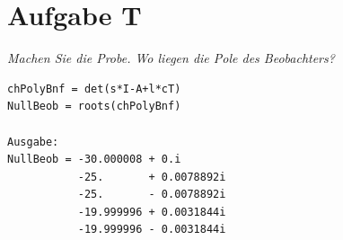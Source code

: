 \section{Aufgabe T}
\textit{Machen Sie die Probe. Wo liegen die Pole des Beobachters?}
 
\begin{lstlisting}[caption = Pole des Beobachters, captionpos = b, label = lst:example]
chPolyBnf = det(s*I-A+l*cT)
NullBeob = roots(chPolyBnf)

Ausgabe:
NullBeob = -30.000008 + 0.i       
           -25.       + 0.0078892i
           -25.       - 0.0078892i
           -19.999996 + 0.0031844i
           -19.999996 - 0.0031844i
\end{lstlisting}










\clearpage
\printbibliography

